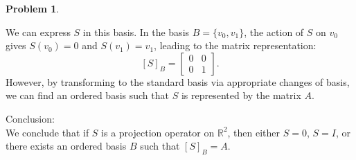 \documentclass[12pt]{article}
\theoremstyle{definition}
\newtheorem{problem}{Problem}
\begin{document}
\begin{problem}
\begin{solution}
        We can express \( S \) in this basis. In the basis \( B = \{ v_0, v_1 \} \), the action of \( S \) on \( v_0 \) gives \( S(v_0) = 0 \) and \( S(v_1) = v_1 \), leading to the matrix representation:
        \[
        [S]_B = 
        \begin{bmatrix}
            0 & 0\\
            0 & 1
        \end{bmatrix}.
        \]
        However, by transforming to the standard basis via appropriate changes of basis, we can find an ordered basis such that \( S \) is represented by the matrix \( A \).

        Conclusion:\\
        We conclude that if \( S \) is a projection operator on \( \mathbb{R}^2 \), then either \( S = 0 \), \( S = I \), or there exists an ordered basis \( B \) such that \( [S]_{B} = A \).

    \end{solution}
\end{problem}
\end{document}
